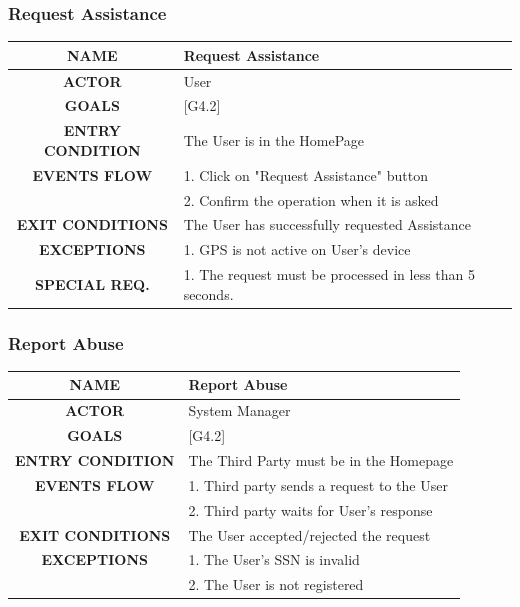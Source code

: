 \documentclass[12pt,a4paper]{article}
\begin{document}
		\subsubsection{Request Assistance}
		\begin{center}
			\begin{tabular}{| c | l |}
				\hline
				\textbf{NAME} & Request Assistance \\
				\hline
				\textbf{ACTOR} & User \\
				\hline
				\textbf{GOALS} & [G4.2] \\
				\hline
				\textbf{ENTRY CONDITION} & The User is in the HomePage \\ \hline
				\textbf{EVENTS FLOW}  &
				1. Click on "Request Assistance" button\\
				&2. Confirm the operation when it is asked\\
				\hline
				\textbf{EXIT CONDITIONS}  & The User has successfully requested Assistance \\ \hline
				\textbf{EXCEPTIONS} &
				1. GPS is not active on User's device\\ \hline
				\textbf{SPECIAL REQ.} &
				1. The request must be processed in less than 5 seconds.\\
				\hline
			\end{tabular}
		\end{center}
	
		\subsubsection{Report Abuse}
		\begin{center}
			\begin{tabular}{| c | l |}
				\hline
				\textbf{NAME} & Report Abuse \\
				\hline
				\textbf{ACTOR} & System Manager \\
				\hline
				\textbf{GOALS} & [G4.2] \\
				\hline
				\textbf{ENTRY CONDITION} & The Third Party must be in the Homepage \\ \hline
				\textbf{EVENTS FLOW}  &
				1. Third party sends a request to the User\\
				&2. Third party waits for User's response\\
				\hline
				\textbf{EXIT CONDITIONS}  & The User accepted/rejected the request \\ \hline
				\textbf{EXCEPTIONS} &
				1. The User's SSN is invalid\\
				&2. The User is not registered\\
				\hline
			\end{tabular}
		\end{center}
\end{document}
